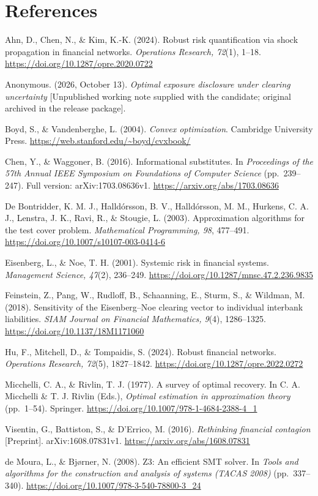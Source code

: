 \documentclass[
  british,
  11pt,
  a4paper,
]{article}
\begin{document}
\begingroup\small

\section{References}\label{references}

Ahn, D., Chen, N., \& Kim, K.-K. (2024). Robust risk quantification via
shock propagation in financial networks. \emph{Operations Research,
72}(1), 1--18. \url{https://doi.org/10.1287/opre.2020.0722}

Anonymous. (2026, October 13). \emph{Optimal exposure disclosure under
clearing uncertainty} {[}Unpublished working note supplied with the
candidate; original archived in the release package{]}.

Boyd, S., \& Vandenberghe, L. (2004). \emph{Convex optimization}.
Cambridge University Press.
\url{https://web.stanford.edu/~boyd/cvxbook/}

Chen, Y., \& Waggoner, B. (2016). Informational substitutes. In
\emph{Proceedings of the 57th Annual IEEE Symposium on Foundations of
Computer Science} (pp.~239--247). Full version: arXiv:1703.08636v1.
\url{https://arxiv.org/abs/1703.08636}

De Bontridder, K. M. J., Halldórsson, B. V., Halldórsson, M. M.,
Hurkens, C. A. J., Lenstra, J. K., Ravi, R., \& Stougie, L. (2003).
Approximation algorithms for the test cover problem. \emph{Mathematical
Programming, 98}, 477--491.
\url{https://doi.org/10.1007/s10107-003-0414-6}

Eisenberg, L., \& Noe, T. H. (2001). Systemic risk in financial systems.
\emph{Management Science, 47}(2), 236--249.
\url{https://doi.org/10.1287/mnsc.47.2.236.9835}

Feinstein, Z., Pang, W., Rudloff, B., Schaanning, E., Sturm, S., \&
Wildman, M. (2018). Sensitivity of the Eisenberg--Noe clearing vector to
individual interbank liabilities. \emph{SIAM Journal on Financial
Mathematics, 9}(4), 1286--1325. \url{https://doi.org/10.1137/18M1171060}

Hu, F., Mitchell, D., \& Tompaidis, S. (2024). Robust financial
networks. \emph{Operations Research, 72}(5), 1827--1842.
\url{https://doi.org/10.1287/opre.2022.0272}

Micchelli, C. A., \& Rivlin, T. J. (1977). A survey of optimal recovery.
In C. A. Micchelli \& T. J. Rivlin (Eds.), \emph{Optimal estimation in
approximation theory} (pp.~1--54). Springer.
\url{https://doi.org/10.1007/978-1-4684-2388-4_1}

Visentin, G., Battiston, S., \& D'Errico, M. (2016). \emph{Rethinking
financial contagion} {[}Preprint{]}. arXiv:1608.07831v1.
\url{https://arxiv.org/abs/1608.07831}

de Moura, L., \& Bjørner, N. (2008). Z3: An efficient SMT solver. In
\emph{Tools and algorithms for the construction and analysis of systems
(TACAS 2008)} (pp.~337--340).
\url{https://doi.org/10.1007/978-3-540-78800-3_24}

\endgroup
\end{document}
